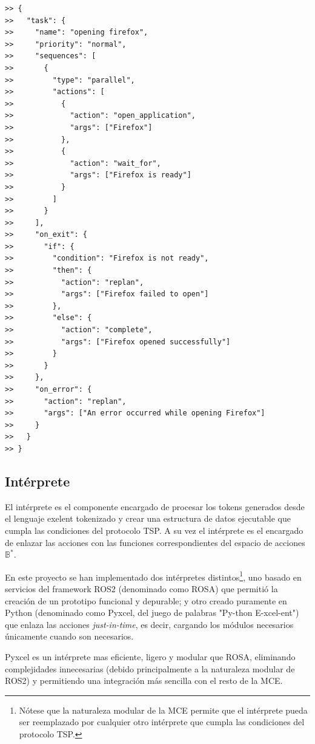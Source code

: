\begin{lstlisting}[caption={Ejemplo de tokenización en Exelent}, label={cod:exelent_tokenization}]
>> {
>>   "task": {
>>     "name": "opening firefox",
>>     "priority": "normal",
>>     "sequences": [
>>       {
>>         "type": "parallel",
>>         "actions": [
>>           {
>>             "action": "open_application",
>>             "args": ["Firefox"]
>>           },
>>           {
>>             "action": "wait_for",
>>             "args": ["Firefox is ready"]
>>           }
>>         ]
>>       }
>>     ],
>>     "on_exit": {
>>       "if": {
>>         "condition": "Firefox is not ready",
>>         "then": {
>>           "action": "replan",
>>           "args": ["Firefox failed to open"]
>>         },
>>         "else": {
>>           "action": "complete",
>>           "args": ["Firefox opened successfully"]
>>         }
>>       }
>>     },
>>     "on_error": {
>>       "action": "replan",
>>       "args": ["An error occurred while opening Firefox"]
>>     }
>>   }
>> }
\end{lstlisting}

\subsection{Intérprete}
El intérprete es el componente encargado de procesar los tokens generados desde
el lenguaje exelent tokenizado y crear una estructura de datos ejecutable que
cumpla las condiciones del protocolo TSP. A su vez el intérprete es el encargado
de enlazar las acciones con las funciones correspondientes del espacio de
acciones \(\mathbb{B}^*\).

En este proyecto se han implementado dos intérpretes distintos\footnote{
Nótese que la naturaleza modular de la MCE permite que el intérprete pueda ser
reemplazado por cualquier otro intérprete que cumpla las condiciones del
protocolo TSP.}, uno basado en servicios del framework ROS2 (denominado como
ROSA) que permitió la creación de un prototipo funcional y depurable; y otro
creado puramente en Python (denominado como Pyxcel, del juego de palabras
"Py-thon E-xcel-ent") que enlaza las acciones \emph{just-in-time}, es
decir, cargando los módulos necesarios únicamente cuando son necesarios.


Pyxcel es un intérprete mas eficiente, ligero y modular que ROSA, eliminando complejidades
innecesarias (debido principalmente a la naturaleza modular de ROS2) y permitiendo
una integración más sencilla con el resto de la MCE.

